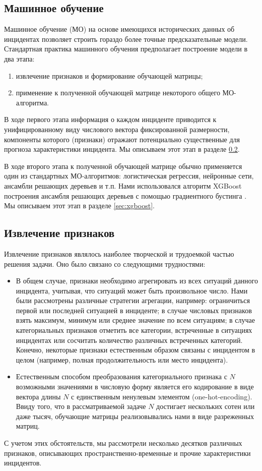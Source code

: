 \subsection{Машинное обучение}
Машинное обучение (МО)  на основе имеющихся исторических данных об инцидентах позволяет строить гораздо более точные предсказательные модели. Стандартная практика машинного обучения \cite{hastie01statisticallearning, Mitchell:1997:ML:541177, scikit-learn} предполагает построение модели в два этапа:
\begin{enumerate}
\item извлечение признаков и формирование обучающей матрицы;
\item применение к полученной обучающей матрице некоторого общего МО-алгоритма.
\end{enumerate}
В ходе первого этапа информация о каждом инциденте приводится к унифицированному виду числового вектора фиксированной размерности, компоненты которого (признаки) отражают потенциально существенные для прогноза характеристики инцидента. Мы описываем этот этап в разделе \ref{sec:feature_extraction}.

В ходе второго этапа к полученной обучающей матрице обычно применяется один из стандартных МО-алгоритмов: логистическая регрессия, нейронные сети, ансамбли решающих деревьев и т.п. Нами использовался алгоритм XGBoost построения ансамбля решающих деревьев с помощью градиентного бустинга \cite{chen2016xgboost}. Мы описываем этот этап в разделе \ref{sec:xgboost}.  

\subsection{Извлечение признаков}\label{sec:feature_extraction}
Извлечение признаков являлось наиболее творческой и трудоемкой частью решения задачи. Оно было связано со следующими трудностями:
\begin{itemize}
\item В общем случае, признаки необходимо агрегировать из всех ситуаций данного инцидента, учитывая, что ситуаций может быть произвольное число. Нами были рассмотрены различные стратегии агрегации, например: ограничиться первой или последней ситуацией в инциденте; в случае числовых признаков взять максимум, минимум или среднее значение по всем ситуациям; в случае категориальных признаков отметить все категории, встреченные в ситуациях инцидентах или сосчитать количество различных встреченных категорий. Конечно, некоторые признаки естественным образом связаны с инцидентом в целом (например, полная продолжительность или место инцидента).
\item Естественным способом преобразования категориального признака с $N$ возможными значениями в числовую форму является его кодирование в виде вектора длины $N$ с единственным ненулевым элементом (one-hot-encoding). Ввиду того, что в рассматриваемой задаче $N$ достигает нескольких сотен или даже тысяч,  обучающие матрицы реализовывались нами в виде разреженных матриц.    
\end{itemize}
С учетом этих обстоятельств, мы рассмотрели несколько десятков различных признаков, описывающих пространственно-временные и прочие характеристики инцидентов. 

